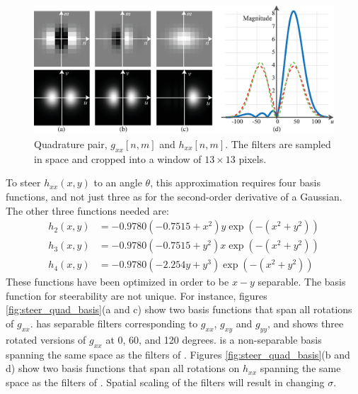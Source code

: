 \begin{figure}[t]
\centerline{
\includegraphics[width=1\linewidth]{figures/spatial_filter_sets/steer_quad_aprox_a.eps}
}
\caption{Quadrature pair, $g_{xx} \left[n,m \right]$ and $h_{xx} \left[n,m \right]$. The filters are sampled in space and cropped into a window of $13\times13$ pixels.}
\label{fig:steerg2h2}
\end{figure}


To steer $h_{xx}(x,y)$ to an angle $\theta$, this approximation requires four basis functions, and not just three as for the second-order derivative of a Gaussian. The other three functions needed are:
\begin{equation}
\begin{split}
h_2(x,y) &= -0.9780(-0.7515+x^2) y \exp \left(-(x^2+y^2) \right) \\
h_3(x,y) &= -0.9780(-0.7515+y^2) x \exp \left(-(x^2+y^2) \right) \\
h_4(x,y) &= -0.9780 (-2.254 y+y^3) \exp \left(-(x^2+y^2) \right) 
\end{split}
\end{equation}
These functions have been optimized in order to be $x-y$ separable. The basis function for steerability are not unique. For instance, figures \ref{fig:steer_quad_basis}(a and c) show two basis functions that span all rotations of $g_{xx}$.  has separable filters corresponding to $g_{xx}$, $g_{xy}$ and $g_{yy}$, and  shows three rotated versions of $g_{xx}$ at 0, 60, and 120 degrees.  is a non-separable basis spanning the same space as the filters of . Figures \ref{fig:steer_quad_basis}(b and d) show two basis functions that span all rotations on $h_{xx}$ spanning the same
space as the filters of . Spatial scaling of the filters will result in changing $\sigma$.


